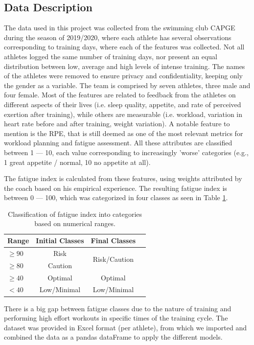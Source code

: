 \documentclass[conference]{IEEEtran}
\begin{document}
\subsection{Data Description}

The data used in this project was collected from the swimming club CAPGE during the season of 2019/2020, where each athlete has several observations corresponding to training days, where each of the features was collected. Not all athletes logged the same number of training days, nor present an equal distribution between low, average and high levels of intense training. The names of the athletes were removed to ensure privacy and confidentiality, keeping only the gender as a variable. The team is comprised by seven athletes, three male and four female. Most of the features are related to feedback from the athletes on different aspects of their lives (i.e. sleep quality, appetite, and rate of perceived exertion after training), while others are measurable (i.e. workload, variation in heart rate before and after training, weight variation). A notable feature to mention is the RPE, that is still deemed as one of the most relevant metrics for workload planning and fatigue assessment. All these attributes are classified between 1 — 10, each value corresponding to increasingly 'worse' categories (e.g., 1 great appetite / normal, 10 no appetite at all).

The fatigue index is calculated from these features, using weights attributed by the coach based on his empirical experience. The resulting fatigue index is between 0 — 100, which was categorized in four classes as seen in Table \ref{classTable}. 


\begin{table}[H]
\centering
\caption{Classification of fatigue index into categories based on numerical ranges.}
\label{classTable}
\begin{tabular}{lccc}
\toprule
\textbf{Range} & \textbf{Initial Classes} & \textbf{Final Classes} \\
\midrule
$\geq  90$ & Risk & \multirow{2}{*}{Risk/Caution} \\
$\geq  80$ & Caution & \\
$\geq 40$ & Optimal & Optimal \\
$< 40$ & Low/Minimal & Low/Minimal \\
\bottomrule
\end{tabular}
\end{table}


There is a big gap between fatigue classes due to the nature of training and performing high effort workouts in specific times of the training cycle. The dataset was provided in Excel format (per athlete), from which we imported and combined the data as a pandas dataFrame to apply the different models.
\end{document}
